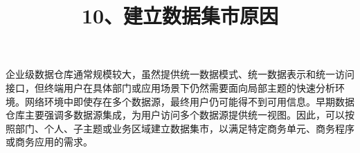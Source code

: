 \documentclass[UTF8,zihao=-4]{ctexart}
\begin{document}
\title{10、建立数据集市原因}
\author{}
\date{}
\maketitle

企业级数据仓库通常规模较大，虽然提供统一数据模式、统一数据表示和统一访问接口，但终端用户在具体部门或应用场景下仍然需要面向局部主题的快速分析环境。网络环境中即使存在多个数据源，最终用户仍可能得不到可用信息。早期数据仓库主要强调多数据源集成，为用户访问多个数据源提供统一视图。因此，可以按照部门、个人、子主题或业务区域建立数据集市，以满足特定商务单元、商务程序或商务应用的需求。\par
\end{document}
